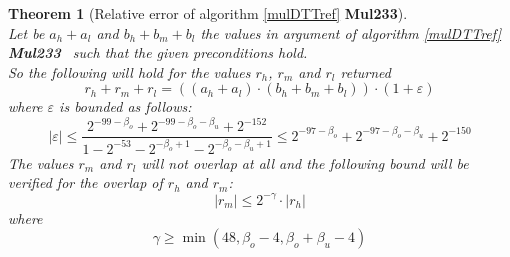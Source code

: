 \documentclass[a4paper,10pt,twoside]{article}
\newtheorem{theorem}{Theorem}[section]
\newcommand{\hi}{\ensuremath{\mathit{h}}}
\newcommand{\mi}{\ensuremath{\mathit{m}}}
\newcommand{\lo}{\ensuremath{\mathit{l}}}
\newcommand{\MulDTT}{{\bf Mul233}}
\renewcommand{\epsilon}{\varepsilon}
\begin{document}
\begin{theorem}[Relative error of algorithm \ref{mulDTTref} \MulDTT] ~ \\
Let be $a_\hi + a_\lo$ and $b_\hi + b_\mi + b_\lo$ the values in argument of algorithm \ref{mulDTTref} \MulDTT~ such that
the given preconditions hold.\\
So the following will hold for the values $r_\hi$, $r_\mi$ and $r_\lo$ returned
$$r_\hi + r_\mi + r_\lo = \left(\left(a_\hi + a_\lo \right) \cdot \left( b_\hi + b_\mi + b_\lo \right)\right) \cdot \left(1 + \epsilon\right)$$
where $\epsilon$ is bounded as follows:
$$\left \vert \epsilon \right \vert \leq \frac{2^{-99 - \beta_o} + 2^{-99 - \beta_o - \beta_u} + 2^{-152}}
                                              {1 - 2^{-53} - 2^{-\beta_o + 1} - 2^{-\beta_o - \beta_u + 1}}
                                    \leq 2^{-97 - \beta_o} + 2^{-97 - \beta_o - \beta_u} + 2^{-150}$$
The values $r_\mi$ and  $r_\lo$ will not overlap at all and the following bound will be verified for the overlap of
$r_\hi$ and $r_\mi$:
$$\left \vert r_\mi \right \vert \leq 2^{-\gamma} \cdot \left \vert r_\hi \right \vert$$
where
$$\gamma \geq \min\left( 48, \beta_o - 4, \beta_o + \beta_u - 4 \right)$$
\end{theorem}
\end{document}
